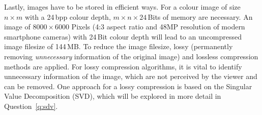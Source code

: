 \documentclass[10pt,addpoints]{exam} %
\begin{document}
Lastly, images have to be stored in efficient ways. For a colour image of size $n\times m$ with a
24\,bpp colour depth, $m \times n \times 24$\,Bits of memory are necessary. An image of
$8000\times 6000$ Pixels (4:3 aspect ratio and 48MP resolution of modern smartphone cameras) with
24\,Bit colour depth will lead to an uncompressed image filesize of 144\,MB. To reduce the image
filesize, lossy (permanently removing \textit{unnecessary} information of the original image) and
lossless compression methods are applied. For lossy compression algorithms, it is vital to identify
unnecessary information of the image, which are not perceived by the viewer and can be removed. One
approach for a lossy compression is based on the Singular Value Decomposition (SVD), which will be
explored in more detail in Question~\ref{q:sdv}.

\newpage
\end{document}
